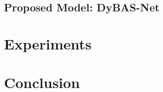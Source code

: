 \documentclass[conference]{IEEEtran}
\begin{document}
\subsection{Proposed Model: DyBAS-Net}
\label{sec:model}



\section{Experiments}
\label{sec:exp}



\section{Conclusion}
\label{sec:conclusion}




\end{document}
